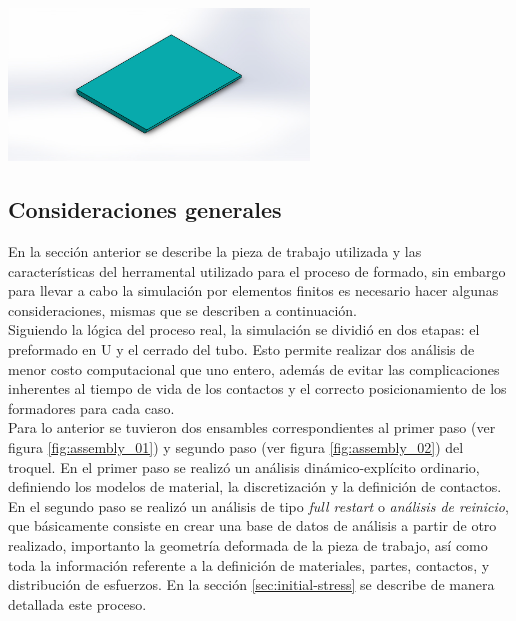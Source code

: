 \begin{center}
\includegraphics[width=0.6\textwidth]{src/ch3/blank.jpg}
\label{fig:blank_inicial}
\end{center}

\subsection{Consideraciones generales}\label{sec:consideraciones-generales}

En la sección anterior se describe la pieza de trabajo utilizada y las características del herramental 
utilizado para el proceso de formado, sin embargo para llevar a cabo la simulación por elementos 
finitos es necesario hacer algunas consideraciones, mismas que se describen a continuación.\\

Siguiendo la lógica del proceso real, la simulación se dividió en dos etapas: el preformado en U y 
el cerrado del tubo. Esto permite realizar dos análisis de menor costo computacional que uno entero, 
además de evitar las complicaciones inherentes al tiempo de vida de los contactos y el correcto 
posicionamiento de los formadores para cada caso.\\

Para lo anterior se tuvieron dos ensambles correspondientes al primer paso (ver figura \ref{fig:assembly_01}) y 
segundo paso (ver figura \ref{fig:assembly_02}) del troquel. En el primer paso se realizó 
un análisis dinámico-explícito ordinario, definiendo los modelos de material, la discretización y 
la definición de contactos. En el segundo paso se realizó un análisis de tipo \textit{full restart} o 
\textit{análisis de reinicio}, que básicamente consiste en crear una base de datos de análisis a 
partir de otro realizado, importanto la geometría deformada de la pieza de trabajo, así como toda 
la información referente a la definición de materiales, partes, contactos, y distribución de esfuerzos. 
En la sección \ref{sec:initial-stress} se describe de manera detallada este proceso. \\

